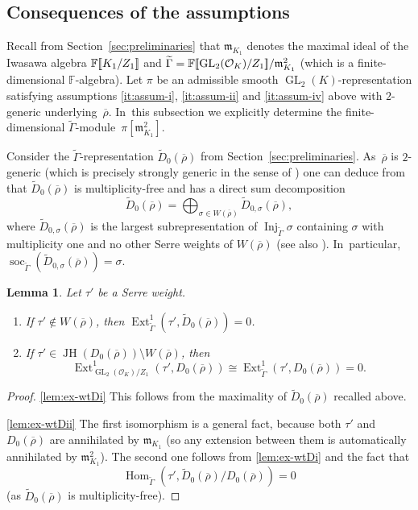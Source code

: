 \documentclass[JEP,XML,SOM,Unicode,NoFloatCountersInSection, NoEqCountersInSection,published]{cedram}
\let\wt\widetilde
\newcommand{\F}{\mathbb{F}}
\newcommand{\cO}{\mathcal{O}}
\newcommand{\fm}{\mathfrak{m}}\let\m\fm
\newcommand{\rhobar}{\overline{\rho}}
\newcommand{\brho}{\overline{\rho}}
\newcommand{\bbra}[1]{[\mkern-3mu[#1]\mkern-3mu]}
\DeclareMathOperator{\Ext}{Ext}
\DeclareMathOperator{\GL}{GL}
\DeclareMathOperator{\Hom}{Hom}
\DeclareMathOperator{\Inj}{Inj}
\DeclareMathOperator{\JH}{\mathrm{JH}}
\DeclareMathOperator{\soc}{soc}
\theoremstyle{plain}
\newtheorem{lem}[prop]{Lemma}
\theoremstyle{definition}
\begin{document}
\subsection{Consequences of the assumptions}

\label{sec:subspace-pi-k1-2}

Recall from Section~\ref{sec:preliminaries} that $\fm_{K_1}$ denotes the maximal ideal of {the Iwasawa algebra} $\F\bbra{K_1/Z_1}$ and $\wt{\Gamma}= \F\bbra{\GL_2(\cO_K)/Z_1}/\fm_{K_1}^2$ (which is a finite-dimensional $\F$-algebra).
Let $\pi$ be an admissible smooth $\GL_2(K)$-representation satisfying assumptions \eqref{it:assum-i}, \eqref{it:assum-ii} and \eqref{it:assum-iv} above with $2$-generic underlying~$\rhobar$. In~this subsection we explicitly determine the finite-dimensional $\wt{\Gamma}$-mod\-ule~$\pi[\fm_{K_1}^2]$.

Consider the $\wt{\Gamma}$-representation $\wt{D}_0(\brho)$ from Section~\ref{sec:preliminaries}. As~$\brho$ is $2$-generic (which is precisely strongly generic in the sense of \cite[Def.\,4.4]{HuWang2}) one can deduce from \cite[Prop.\,4.1, Thm.~4.6]{HuWang2} that $\wt{D}_0(\brho)$ is multiplicity-free and has a direct sum decomposition
\[
\wt{D}_0(\brho)= \bigoplus_{\sigma\in W(\brho)}\wt{D}_{0,\sigma}(\brho),
\]
where $\wt{D}_{0,\sigma}(\brho)$ is the largest subrepresentation of $\Inj_{\wt{\Gamma}}\sigma$ containing $\sigma$ with multiplicity one and no other Serre weights of $W(\brho)$ (see also \cite[Th.\,8.4.2]{BHHMS1}). In~particular, $\soc_{\wt{\Gamma}}(\wt{D}_{0,\sigma}(\brho))=\sigma$.

\begin{lem}\label{lem:ex-wtD}
Let $\tau'$ be a Serre weight.
\begin{enumerate}
\item\label{lem:ex-wtDi} If $\tau'\notin W(\brho)$, then $\Ext^1_{\wt{\Gamma}}(\tau',\wt{D}_0(\brho))=0$.
\item\label{lem:ex-wtDii} If $\tau'\in\JH(D_0(\brho))\setminus W(\brho)$, then
\[
\Ext^1_{\GL_2(\cO_K)/Z_1}(\tau',D_0(\brho))\cong\Ext^1_{\wt{\Gamma}}(\tau',D_0(\brho))=0.
\]
\end{enumerate}
\end{lem}

\skpt
\begin{proof}
\eqref{lem:ex-wtDi} This follows from the maximality of $\wt{D}_{0}(\brho)$ recalled above.

\eqref{lem:ex-wtDii} The first isomorphism is a general fact, because both $\tau'$ and $D_0(\brho)$ are annihilated by $\m_{K_1}$ (so any extension between them is automatically annihilated by $\m_{K_1}^2$). The second one follows from \eqref{lem:ex-wtDi} and the fact that
\[
\Hom_{\wt{\Gamma}}(\tau',\wt{D}_0(\brho)/D_0(\brho))=0
\]
(as $\wt{D}_0(\brho)$ is multiplicity-free).
\end{proof}
\end{document}
